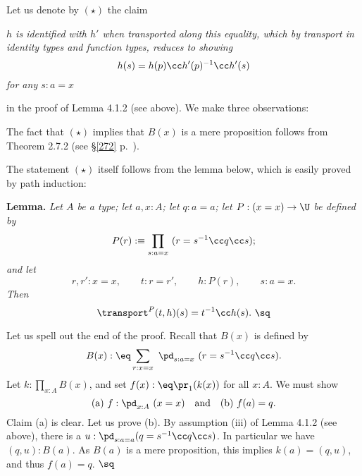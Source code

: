 \documentclass[12pt]{article}
\begin{document}
Let us denote by $(\star)$ the claim 

\nn\emph{$h$ is identified with $h'$ when transported along this equality, which by transport in identity types and function types, reduces to showing 
$$
h(s)=h(p)\cc h'(p)^{-1}\cc h'(s)
$$ 
for any $s:a=x$}

\nn in the proof of Lemma 4.1.2 (see above). We make three observations:

\nn{} The fact that $(\star)$ implies that $B(x)$ is a mere proposition follows from Theorem 2.7.2 (see \S\ref{272} p.~\pageref{272}). 

\nn{} The statement $(\star)$ itself follows from the lemma below, which is easily proved by path induction:

\nn\textbf{Lemma.} \emph{Let $A$ be a type; let $a,x:A$; let $q:a=a$; let $P:(x=x)\to\U$ be defined by} 
$$
P(r):\equiv\prod_{s:a=x}\ (r=s^{-1}\cc q\cc s);
$$ 
\emph{and let} 
$$
r,r':x=x,\qquad t:r=r',\qquad h:P(r),\qquad s:a=x.
$$ 
\emph{Then} 
$$
\transport^P(t,h)(s)=t^{-1}\cc h(s).\ \sq
$$ 

\nn{} Let us spell out the end of the proof. Recall that $B(x)$ is defined by
$$
B(x):\eq\sum_{r:x=x}\ \pd_{s:a=x}\ (r=s^{-1}\cc q\cc s).
$$ 
Let $k:\prod_{x:A}B(x)$, and set $f(x):\eq\pr_1(k(x))$ for all $x:A$. We must show 
$$
\text{(a) }f:\pd_{x:A}\ (x=x)\quad\text{and}\quad\text{(b) }f(a)=q.
$$ 
Claim (a) is clear. Let us prove (b). By assumption (iii) of Lemma 4.1.2 (see above), there is a $u:\pd_{s:a=a}(q=s^{-1}\cc q\cc s)$. In particular we have $(q,u):B(a)$. As $B(a)$ is a mere proposition, this implies $k(a)=(q,u)$, and thus $f(a)=q$. $\sq$



\begin{comment}

\subsection{Lemma 4.2.9}

Let $f:A\to B$. Recall the statement of Lemma 4.2.9: 

If $f$ is invertible, then $\ms{linv}(f)$ and $\ms{rinv}(f)$ are contractible. 

The following slightly stronger statement is an immediate consequence of Exercise 4.5 (see \S\ref{45} p.~\pageref{45} below): 

If $\ell,r:B\to A$ are respectively a left inverse of $f$ and a right inverse of $f$, then $f$ admits an inverse $i:B\to A$, and we have $\ell=i=r$.

\end{comment}
\end{document}
